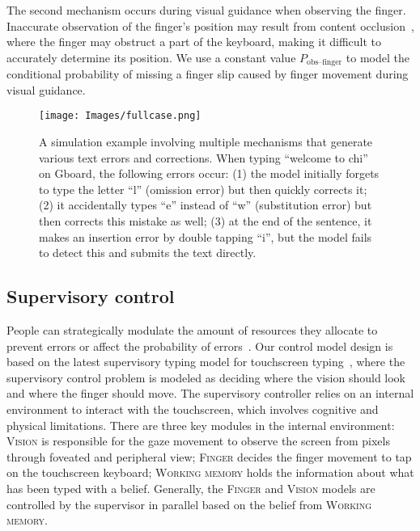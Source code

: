 The second mechanism occurs during visual guidance when observing the finger. Inaccurate observation of the finger's position may result from content occlusion~\cite{baudisch2009back}, where the finger may obstruct a part of the keyboard, making it difficult to accurately determine its position. We use a constant value $P_{\text {obs--finger}}$ to model the conditional probability of missing a finger slip caused by finger movement during visual guidance.

\begin{figure}[!t]
\centering
  \texttt{[image: Images/fullcase.png]}
  \caption{A simulation example involving multiple mechanisms that generate various text errors and corrections.  When typing ``welcome to chi'' on Gboard, the following errors occur: (1) the model initially forgets to type the letter ``l'' (omission error) but then quickly corrects it; (2) it accidentally types ``e'' instead of ``w'' (substitution error) but then corrects this mistake as well; (3) at the end of the sentence, it makes an insertion error by double tapping ``i'', but the model fails to detect this and submits the text directly.}
  \label{fig:errorcase}
\end{figure}

\subsection{Supervisory control} 
\label{sec:supervisory-control}

People can strategically modulate the amount of resources they allocate to prevent errors or affect the probability of errors~\cite{anderson2004integrated, fodor1983modularity}.
Our control model design is based on the latest supervisory typing model for touchscreen typing~\cite{shi2024crtypist}, where the supervisory control problem is modeled as deciding where the vision should look and where the finger should move.
The supervisory controller relies on an internal environment to interact with the touchscreen, which involves cognitive and physical limitations.
There are three key modules in the internal environment: \textsc{Vision} is responsible for the gaze movement to observe the screen from pixels through foveated and peripheral view; \textsc{Finger} decides the finger movement to tap on the touchscreen keyboard; \textsc{Working memory} holds the information about what has been typed with a belief. Generally, the \textsc{Finger} and \textsc{Vision} models are controlled by the supervisor in parallel based on the belief from \textsc{Working memory}.

